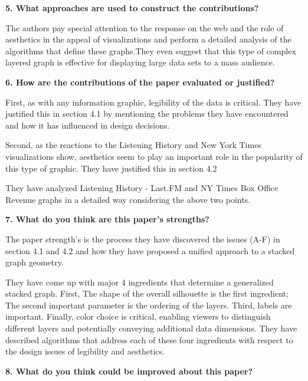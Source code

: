 \documentclass{article}[12pt]
\begin{document}
\vspace{2ex}\noindent
{\bf 5. What approaches are used to construct the contributions?}

{
    The authors pay special attention to the response on the web and the role of aesthetics in the appeal of visualizations and perform a detailed analysis of the algorithms that define these graphs.They even suggest that this type of complex layered graph is effective for displaying large data sets to a mass audience. 

}



\vspace{2ex}\noindent
{\bf 6. How are the contributions of the paper evaluated or justified? }

{
    First, as with any information graphic, legibility of the data is critical. They have justified this in section 4.1 by mentioning the problems they have encountered and how it has influenced in design decisions.

    Second, as the reactions to the Listening History and New York Times visualizations show, aesthetics seem to play an important role in the popularity of this type of graphic. They have justified this in section 4.2

    They have analyzed Listening History - Last.FM and NY Times Box Office Revenue graphs in a detailed way considering the above two points. 
    
}



\vspace{2ex}\noindent
{\bf 7. What do you think are this paper's strengths? }

{
    The paper strength's is the process they have discovered the issues (A-F) in section 4.1 and 4.2 and how they have proposed a unified approach to a stacked graph geometry.
    
    They have come up with major 4 ingredients that determine a generalized stacked graph. First, The shape of the overall silhouette is the first ingredient; The second important parameter is the ordering of the layers. Third, labels are important. Finally, color choice is critical, enabling viewers to distinguish different layers and potentially conveying additional data dimensions. They have described algorithms that address each of these four ingredients with respect to the design issues of legibility and aesthetics.

}

\vspace{2ex}\noindent
{\bf 8. What do you think could be improved about this paper? }
\end{document}
